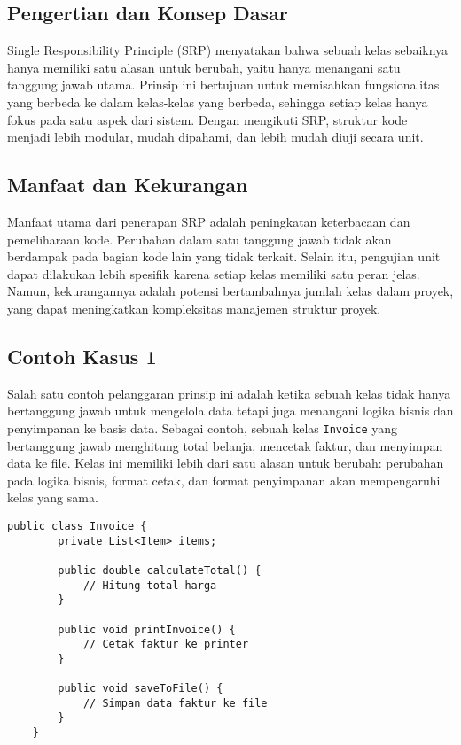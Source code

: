 \subsection{Pengertian dan Konsep Dasar}
Single Responsibility Principle (SRP) menyatakan bahwa sebuah kelas sebaiknya hanya memiliki satu alasan untuk berubah, yaitu hanya menangani satu tanggung jawab utama. Prinsip ini bertujuan untuk memisahkan fungsionalitas yang berbeda ke dalam kelas-kelas yang berbeda, sehingga setiap kelas hanya fokus pada satu aspek dari sistem. Dengan mengikuti SRP, struktur kode menjadi lebih modular, mudah dipahami, dan lebih mudah diuji secara unit.

\subsection{Manfaat dan Kekurangan}
Manfaat utama dari penerapan SRP adalah peningkatan keterbacaan dan pemeliharaan kode. Perubahan dalam satu tanggung jawab tidak akan berdampak pada bagian kode lain yang tidak terkait. Selain itu, pengujian unit dapat dilakukan lebih spesifik karena setiap kelas memiliki satu peran jelas. Namun, kekurangannya adalah potensi bertambahnya jumlah kelas dalam proyek, yang dapat meningkatkan kompleksitas manajemen struktur proyek.

\subsection{Contoh Kasus 1}
Salah satu contoh pelanggaran prinsip ini adalah ketika sebuah kelas tidak hanya bertanggung jawab untuk mengelola data tetapi juga menangani logika bisnis dan penyimpanan ke basis data. Sebagai contoh, sebuah kelas \texttt{Invoice} yang bertanggung jawab menghitung total belanja, mencetak faktur, dan menyimpan data ke file. Kelas ini memiliki lebih dari satu alasan untuk berubah: perubahan pada logika bisnis, format cetak, dan format penyimpanan akan mempengaruhi kelas yang sama.

\begin{lstlisting}[style=JavaStyle, caption={Contoh pelanggaran SRP}]
	public class Invoice {
		private List<Item> items;
		
		public double calculateTotal() {
			// Hitung total harga
		}
		
		public void printInvoice() {
			// Cetak faktur ke printer
		}
		
		public void saveToFile() {
			// Simpan data faktur ke file
		}
	}
\end{lstlisting}

